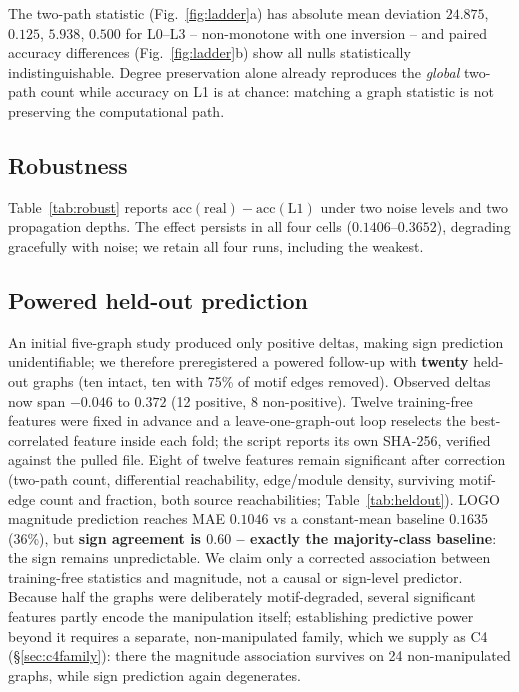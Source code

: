\documentclass[10pt,twocolumn,letterpaper]{article}
\begin{document}
The two-path statistic (Fig.~\ref{fig:ladder}a) has absolute mean deviation
$24.875$, $0.125$, $5.938$, $0.500$ for L0--L3 -- non-monotone with one
inversion -- and paired accuracy differences (Fig.~\ref{fig:ladder}b) show all
nulls statistically indistinguishable. Degree preservation alone already
reproduces the \emph{global} two-path count while accuracy on L1 is at chance:
matching a graph statistic is not preserving the computational path.

\subsection{Robustness}
\label{sec:robust}

Table~\ref{tab:robust} reports $\mathrm{acc}(\text{real})-\mathrm{acc}(\text{L1})$
under two noise levels and two propagation depths. The effect persists in all
four cells ($0.1406$--$0.3652$), degrading gracefully with noise; we retain
all four runs, including the weakest.

\subsection{Powered held-out prediction}
\label{sec:heldout}

An initial five-graph study produced only positive deltas, making sign
prediction unidentifiable; we therefore preregistered a powered follow-up with
\textbf{twenty} held-out graphs (ten intact, ten with 75\% of motif edges
removed). Observed deltas now span $-0.046$ to $0.372$ (12 positive, 8
non-positive). Twelve training-free features were fixed in advance and a
leave-one-graph-out loop reselects the best-correlated feature inside each
fold; the script reports its own SHA-256, verified against the pulled file.
Eight of twelve features remain significant after correction (two-path count,
differential reachability, edge/module density, surviving motif-edge count and
fraction, both source reachabilities; Table~\ref{tab:heldout}). LOGO magnitude
prediction reaches MAE $0.1046$ vs a constant-mean baseline $0.1635$ (36\%),
but \textbf{sign agreement is $0.60$ -- exactly the majority-class baseline}:
the sign remains unpredictable. We claim only a corrected association between
training-free statistics and magnitude, not a causal or sign-level predictor.
Because half the graphs were deliberately motif-degraded, several significant
features partly encode the manipulation itself; establishing predictive power
beyond it requires a separate, non-manipulated family, which we supply as C4
(\S\ref{sec:c4family}): there the magnitude association survives on 24
non-manipulated graphs, while sign prediction again degenerates.
\end{document}
